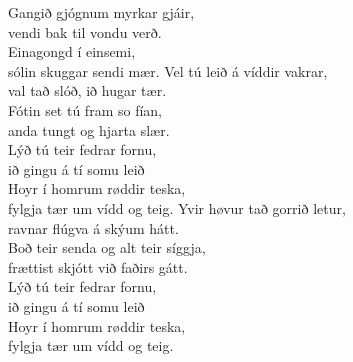 \begin{flushleft}
Gangið gjógnum myrkar gjáir,\\
vendi bak til vondu verð.\\
Einagongd í einsemi,\\
sólin skuggar sendi mær.
\hops
Vel tú leið á víddir vakrar,\\
val tað slóð, ið hugar tær.\\
Fótin set tú fram so fían,\\
anda tungt og hjarta slær.
\hops
\hspace{0.9cm}\\
\hspace{0.9cm}Lýð tú teir fedrar fornu,\\
\hspace{0.9cm}ið gingu á tí somu leið\\
\hspace{0.9cm}Hoyr í homrum røddir teska,\\
\hspace{0.9cm}fylgja tær um vídd og teig.
\hops
Yvir høvur tað gorrið letur,\\
ravnar flúgva á skýum hátt.\\
Boð teir senda og alt teir síggja,\\
frættist skjótt við faðirs gátt.
\hops
\hspace{0.9cm}\\
\hspace{0.9cm}Lýð tú teir fedrar fornu,\\
\hspace{0.9cm}ið gingu á tí somu leið\\
\hspace{0.9cm}Hoyr í homrum røddir teska,\\
\hspace{0.9cm}fylgja tær um vídd og teig.
\end{flushleft}
\newpage